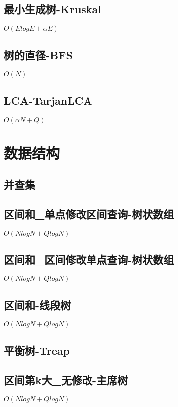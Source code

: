 \documentclass[10pt]{article}
\begin{document}
\subsection{最小生成树-Kruskal}
$O(ElogE+αE)$


\subsection{树的直径-BFS}
$O(N)$


\subsection{LCA-TarjanLCA}
$O(αN+Q)$

\section{数据结构}
\subsection{并查集}


\subsection{区间和\_单点修改区间查询-树状数组}
$O(NlogN+QlogN)$


\subsection{区间和\_区间修改单点查询-树状数组}
$O(NlogN+QlogN)$


\subsection{区间和-线段树}
$O(NlogN+QlogN)$


\subsection{平衡树-Treap}


\subsection{区间第k大\_无修改-主席树}
$O(NlogN+QlogN)$

\end{document}
